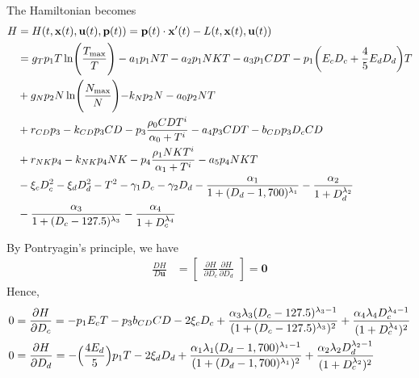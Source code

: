 \documentclass[12pt]{article}
\begin{document}
The Hamiltonian becomes
\begin{align*}
	H &= H(t, \mathbf{x}(t), \mathbf{u}(t), \mathbf{p}(t)) = \mathbf{p}(t)\cdot \mathbf{x}^\prime(t) - L(t, \mathbf{x}(t), \mathbf{u}(t)) \\
	   &= g_T p_1T\ln\Biggl(\frac{T_{\max}}{T} \Biggr)-a_1 p_1NT-a_2 p_1NKT-a_3p_1CDT-p_1\biggl(E_cD_c+\frac{4}{5}E_dD_d \biggr)T\\
	   &+g_Np_2N\ln\Biggl(\frac{N_{\max}}{N}\Biggl)-k_Np_2N-a_0p_2NT\\
	   &+r_{CD} p_3-k_{CD} p_3 CD-p_3\frac{\rho_0CDT^i}{\alpha_0+T^i}-a_4p_3CDT-b_{CD}p_3D_cCD\\
	   &+r_{NK}p_4-k_{NK} p_4NK-p_4\frac{\rho_1NKT^i}{\alpha_1+T^i}-a_5p_4NKT\\
	   &-\xi_cD_c^2-\xi_dD_d^2-T^2-\gamma_1D_c-\gamma_2D_d - \frac{\alpha_1}{1 + (D_d - 1,700)^{\lambda_1}} - \frac{\alpha_2}{1 + D_d ^{\lambda_2}} \\
	   & -  \frac{\alpha_3}{1 + (D_c - 127.5)^{\lambda_3}} - \frac{\alpha_4}{1 + D_c^{\lambda_4}} 
\end{align*}

By Pontryagin's principle, we have
\begin{align*}
	\frac{DH}{D\mathbf{u}} &=\begin{bmatrix} \frac{\partial{H}}{\partial{D_c}} \frac{\partial{H}}{\partial{D_d}}\end{bmatrix} =\mathbf{0}
\end{align*}
Hence, 
\begin{align*}
0 &= \frac{\partial{H}}{\partial{D_c}} = -p_1E_cT-p_3b_{CD}CD-2\xi_cD_c+ \frac{\alpha_3 \lambda_3 (D_c - 127.5)^{\lambda_3 - 1}}{(1 + (D_c - 127.5)^{\lambda_3})^{2}} + \frac{\alpha_4 \lambda_4 D_c^{\lambda_4 -1}}{(1 + D_c^{\lambda_4})^2} \\
0 &= \frac{\partial{H}}{\partial{D_d}} = -\Bigl(\frac{4E_d}{5} \Bigr) p_1 T-2\xi_dD_d + \frac{\alpha_1 \lambda_1 (D_d - 1,700)^{\lambda_1 - 1}}{(1 + (D_d - 1,700)^{\lambda_1})^2} + \frac{\alpha_2 \lambda_2 D_d^{\lambda_2-1}}{(1 + D_c^{\lambda_2})^2}
\end{align*}
\end{document}
